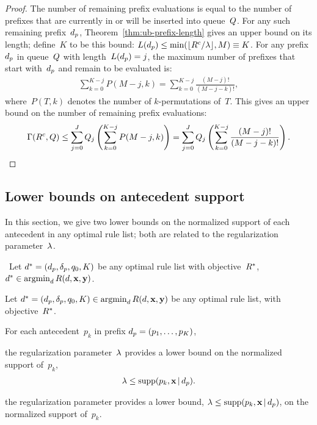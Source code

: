 \begin{arxiv}
\begin{proof}
The number of remaining prefix evaluations is equal to the number of
prefixes that are currently in or will be inserted into queue~$Q$.
%
For any such remaining prefix~$d_p$,
Theorem~\ref{thm:ub-prefix-length} gives an upper bound on its length;
define~$K$ to be this bound:
${L(d_p) \le \min(\lfloor {R^c} / {\lambda} \rfloor, M) \equiv K}$.
%
For any prefix~$d_p$ in queue~$Q$ with length~${L(d_p) = j}$,
the maximum number of prefixes that start with~$d_p$
and remain to be evaluated is:
\begin{align}
\sum_{k=0}^{K-j} P(M-j, k) = \sum_{k=0}^{K-j} \frac{(M-j)!}{(M-j - k)!},
\end{align}
where~${P(T, k)}$ denotes the number of $k$-permutations of~$T$.
%
This gives an upper bound on the number of remaining prefix evaluations:
\begin{align}
\Gamma({R^c}, Q)
\le \sum_{j=0}^J Q_j \left( \sum_{k=0}^{K-j} P(M-j, k) \right)
= \sum_{j=0}^J Q_j \left( \sum_{k=0}^{K-j} \frac{(M-j)!}{(M-j - k)!} \right).
\end{align}
\end{proof}
\end{arxiv}

\subsection{Lower bounds on antecedent support}
\label{sec:lb-support}

In this section, we give two lower bounds on the normalized support
of each antecedent in any optimal rule list;
both are related to the regularization parameter~${\lambda}$.

\begin{theorem}
\label{thm:min-capture}
\begin{arxiv}
~Let ${d^* = (d_p, \delta_p, q_0, K)}$
be any optimal rule list with objective~$R^*$, \ie
${d^* \in \operatorname*{argmin}_{d} R({d}, \mathbf{x}, \mathbf{y})}$.
\end{arxiv}
\begin{kdd}
Let ${d^* = (d_p, \delta_p, q_0, K) \in \operatorname*{argmin}_{d} R({d}, \mathbf{x}, \mathbf{y})}$
be any optimal rule list, with objective~$R^*$.
\end{kdd}
For each antecedent~$p_k$ in prefix ${d_p = (p_1, \dots, p_K)}$,
\begin{arxiv}
the regularization parameter~${\lambda}$ provides a lower bound
on the normalized support of~$p_k$,
\begin{align}
{\lambda} \le \textnormal{supp}(p_k, \mathbf{x} \,|\, d_p).
\label{eq:min-capture}
\end{align}
\end{arxiv}
\begin{kdd}
the regularization parameter provides a lower bound,
${{\lambda} \le \textnormal{supp}(p_k, \mathbf{x} \,|\, d_p)}$, on the normalized support of~$p_k$.
\end{kdd}
\end{theorem}

